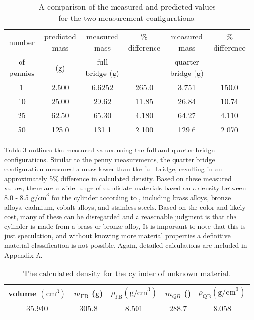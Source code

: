 \documentclass[12pt, letterpaper]{article}
\newcommand{\z}[1]{\text{#1}} %
\begin{document}
\begin{table} [h]
\centering
\caption{A comparison of the measured and predicted values \\  for the two measurement configurations.}
\begin{tabular}{c c c c c c} \toprule
number      & predicted mass & measured mass & \% difference & measured mass  &\% difference \\
of pennies  & (g)                   &  full bridge (g)   &                       & quarter bridge (g)  &   \\ \midrule
1 & 2.500 & 6.6252 & 265.0 & 3.751 & 150.0 \\ \midrule
10 & 25.00 & 29.62 & 11.85 & 26.84 & 10.74 \\ \midrule
25 & 62.50 & 65.30 & 4.180 & 64.27 & 4.110 \\ \midrule
50 & 125.0 & 131.1 & 2.100 & 129.6 & 2.070 \\ \bottomrule
\end{tabular}
\label{table 2}

\end{table}

Table 3 outlines the measured values using the full and quarter bridge
configurations. Similar to the penny measurements, the quarter bridge
configuration measured a mass lower than the full bridge, resulting in an
approximately 5\% difference in calculated density.   Based on these
measured values, there are a wide range of candidate materials based on a
density between 8.0 - 8.5 $\z{g/cm}^3$  for the cylinder according to
\cite{thermtest}, including brass alloys, bronze alloys, cadmium, cobalt
alloys, and stainless steels.
Based on the color and likely cost, many of these can be disregarded and a
reasonable judgment is that the cylinder is made from a brass or bronze alloy,
It is important to note that this is just speculation, and without knowing
more material properties a definitive material classification is not possible.
Again, detailed calculations are included in Appendix A.

\begin{table}[h]
\begin{center}
   \caption{The calculated density for the cylinder of unknown material.}
\begin{tabular}{ccccc} \toprule
   volume $(\z{cm}^3)$ & $m_{\z{FB}}$ (g) & $\rho_{\z{FB}} (\z{g/cm}^3)$
   & $m_{QB}$ (\z{g}) & $\rho_{\z{QB}} (\z{g/cm}^3)$ \\ \midrule
35.940 & 305.8 & 8.501 & 288.7 & 8.058 \\ \bottomrule
\end{tabular}
\label{table3}
\end{center}
\end{table}
\end{document}
